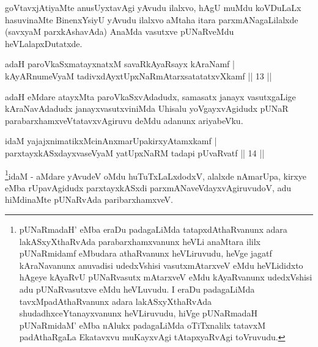 \begin{artha}
goVtavxjAtiyaMte anusUyxtavAgi yAvudu ilalxvo, hAgU muMdu koVDuLaLx hasuvinaMte BinenxYsiyU yAvudu ilalxvo aMtaha itara parxmANagaLilalxde (savxyaM parxkAshavAda) AnaMda vasutxve pUNaRveMdu heVLalapxDutatxde.
\end{artha}


\begin{shl}
\footnotemark[1]{}adaH paroVkaSxmatayxnatxM savaRkAyaRsayx kAraNamf  | \\
kAyARnumeVyaM tadivxdAyxtUpxNaRmAtarxsatatatxvXkamf \hfill ||  13 ||  
\end{shl}

\begin{artha}
adaH eMdare atayxMta paroVkaSxvAdadudx, samasatx janayx vasutxgaLige kAraNavAdadudx janayxvasutxviniMda Uhisalu yoVgayxvAgidudx pUNaR parabarxhamxveVtatavxvAgiruvu deMdu adanunx ariyabeVku.
\end{artha}


\begin{shl}
idaM yajajxnimatikxMcinAnxmarUpakirxyAtamxkamf  | \\
parxtayxkASxdayxvaseVyaM yatUpxNaRM tadapi pUvaRvatf \hfill||  14 ||  
\end{shl}

\begin{artha}
\footnote{pUNaRmadaH' eMba eraDu padagaLiMda tatapxdAthaRvanunx adara lakASxyXthaRvAda parabarxhamxvanunx heVLi anaMtara ililx pUNaRmidamf eMbudara athaRvanunx heVLiruvudu, heVge jagatf kAraNavanunx anuvadisi udedxVshisi vasutxmAtarxveV eMdu heVLididxto hAgeye kAyaRvU pUNaRvasutx mAtarxveV eMdu kAyaRvanunx udedxVshisi adu pUNaRvasutxve eMdu heVLuvudu. I eraDu padagaLiMda tavxMpadAthaRvanunx adara lakASxyXthaRvAda shudadhxceYtanayxvanunx heVLiruvudu, hiVge pUNaRmadaH pUNaRmidaM' eMba nAlukx padagaLiMda oTiTxnalilx tatavxM padAthaRgaLa Ekatavxvu muKayxvAgi tAtapxyaRvAgi toVruvudu.}idaM - aMdare yAvudeV oMdu huTuTxLaLxdodxV, alalxde nAmarUpa, kirxye eMba rUpavAgidudx parxtayxkASxdi parxmANaveVdayxvAgiruvudoV, adu hiMdinaMte pUNaRvAda paribarxhamxveV. 
\end{artha}

